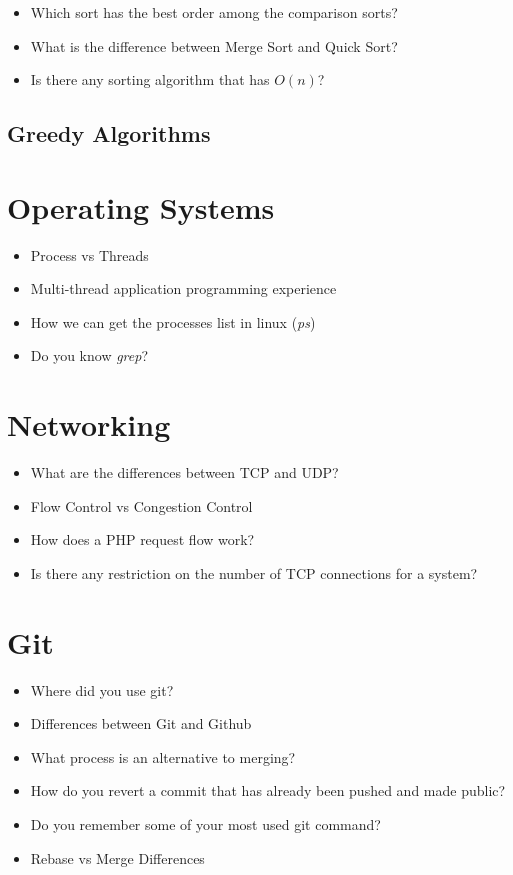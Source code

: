 \documentclass[]{article}
\begin{document}
\begin{multicols}{2}
  \begin{itemize}
    \item Which sort has the best order among the comparison sorts?
    \item What is the difference between Merge Sort and Quick Sort?
    \item Is there any sorting algorithm that has $O(n)$?
  \end{itemize}

  \subsection{Greedy Algorithms}

  \section{Operating Systems}
  \begin{itemize}
    \item Process vs Threads
    \item Multi-thread application programming experience
    \item How we can get the processes list in linux (\textit{ps})
    \item Do you know \textit{grep}?
  \end{itemize}

  \section{Networking}
  \begin{itemize}
    \item What are the differences between TCP and UDP\@?
    \item Flow Control vs Congestion Control
    \item How does a PHP request flow work?
    \item Is there any restriction on the number of TCP connections for a system?
  \end{itemize}

  \section{Git}
  \begin{itemize}
    \item Where did you use git?
    \item Differences between Git and Github
    \item What process is an alternative to merging?
    \item How do you revert a commit that has already been pushed and made public?
    \item Do you remember some of your most used git command?
    \item Rebase vs Merge Differences
  \end{itemize}


\end{multicols}
\end{document}
